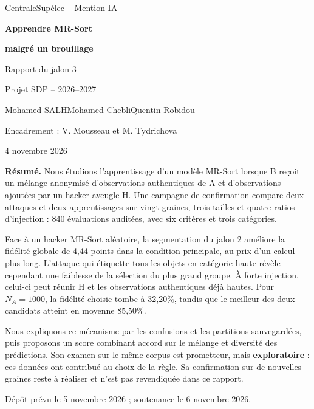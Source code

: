 \documentclass[11pt,a4paper]{article}
\begin{document}
\begin{titlepage}
\centering
{\large CentraleSupélec -- Mention IA\par}
\vspace{1.5cm}
{\color{bleu}\Huge\bfseries Apprendre MR-Sort\par}
\vspace{0.3cm}
{\color{bleu}\Huge\bfseries malgré un brouillage\par}
\vspace{0.7cm}
{\Large Rapport du jalon 3\par}
\vspace{0.3cm}
{\large Projet SDP -- 2026--2027\par}
\vspace{1cm}
{\large Mohamed SALH\quad Mohamed Chebli\quad Quentin Robidou\par}
\vspace{0.4cm}
{Encadrement : V. Mousseau et M. Tydrichova\par}
\vspace{0.3cm}
{4 novembre 2026\par}
\vspace{1cm}
\begin{minipage}{0.94\textwidth}
\textbf{Résumé.} Nous étudions l'apprentissage d'un modèle MR-Sort lorsque B
reçoit un mélange anonymisé d'observations authentiques de A et d'observations
ajoutées par un hacker aveugle H. Une campagne de confirmation compare deux
attaques et deux apprentissages sur vingt graines, trois tailles et quatre
ratios d'injection : 840 évaluations auditées, avec six critères et trois catégories.

Face à un hacker MR-Sort aléatoire, la segmentation du jalon 2 améliore la
fidélité globale de 4,44 points dans la condition principale, au prix d'un
calcul plus long. L'attaque qui étiquette tous les objets en catégorie haute
révèle cependant une faiblesse de la sélection du plus grand groupe. À forte
injection, celui-ci peut réunir H et les observations authentiques déjà hautes.
Pour $N_A=1000$, la fidélité choisie tombe à 32,20\%, tandis que le meilleur des
deux candidats atteint en moyenne 85,50\%.

Nous expliquons ce mécanisme par les confusions et les partitions sauvegardées,
puis proposons un score combinant accord sur le mélange et diversité des
prédictions. Son examen sur le même corpus est prometteur, mais \textbf{exploratoire} :
ces données ont contribué au choix de la règle. Sa confirmation sur de nouvelles
graines reste à réaliser et n'est pas revendiquée dans ce rapport.
\end{minipage}
\vfill
{\small Dépôt prévu le 5 novembre 2026 ; soutenance le 6 novembre 2026.\par}
\thispagestyle{empty}
\end{titlepage}
\setcounter{tocdepth}{1}
\tableofcontents
\newpage
\end{document}
